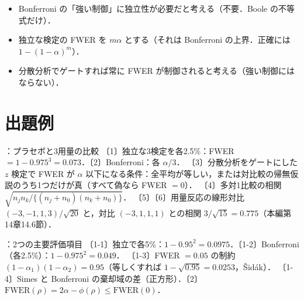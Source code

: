 \begin{warnbox}
\begin{itemize}
\item Bonferroni の「強い制御」に独立性が必要だと考える（不要．Boole の不等式だけ）．
\item 独立な検定の FWER を $m\alpha$ とする（それは Bonferroni の上界．正確には $1-(1-\alpha)^m$）．
\item 分散分析でゲートすれば常に FWER が制御されると考える（強い制御にはならない）．
\end{itemize}
\end{warnbox}

\section{出題例}\label{sec:m08-shutsudai}
\begin{shutsudai}{：プラセボと3用量の比較}
〔1〕独立な3検定を各2.5\%：FWER $=1-0.975^3=0.073$．〔2〕Bonferroni：各 $\alpha/3$．
〔3〕分散分析をゲートにした $z$ 検定で FWER が $\alpha$ 以下になる条件：全平均が等しい，または対比較の帰無仮説のうち1つだけが真（すべて偽なら FWER $=0$）．
〔4〕多対1比較の相関 $\sqrt{n_jn_k/\{(n_j+n_0)(n_k+n_0)\}}$．
〔5〕〔6〕用量反応の線形対比 $(-3,-1,1,3)/\sqrt{20}$ と，対比 $(-3,1,1,1)$ との相関 $3/\sqrt{15}=0.775$（本編第14章14.6節）．
\end{shutsudai}
\begin{shutsudai}{：2つの主要評価項目}
〔1-1〕独立で各5\%：$1-0.95^2=0.0975$．〔1-2〕Bonferroni（各2.5\%）：$1-0.975^2=0.049$．
〔1-3〕FWER $=0.05$ の制約 $(1-\alpha_1)(1-\alpha_2)=0.95$（等しくすれば $1-\sqrt{0.95}=0.0253$，Šidák）．
〔1-4〕Simes と Bonferroni の棄却域の差（正方形）．〔2〕$\mathrm{FWER}(\rho)=2\alpha-\phi(\rho)\le\mathrm{FWER}(0)$．
\end{shutsudai}

